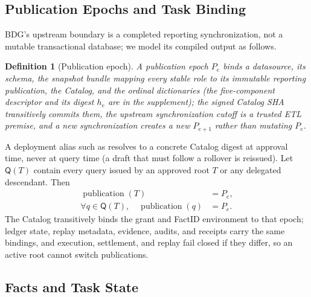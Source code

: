 \documentclass[10pt,journal,compsoc]{IEEEtran}
\newcommand{\code}[1]{\texttt{\detokenize{#1}}}
\newtheorem{definition}{Definition}
\begin{document}
\subsection{Publication Epochs and Task Binding}

BDG's upstream boundary is a completed reporting synchronization, not a
mutable transactional database; we model its compiled output as follows.

\begin{definition}[Publication epoch]
A publication epoch $P_e$ binds a datasource, its schema, the snapshot
bundle mapping every stable role to its immutable reporting publication,
the Catalog, and the ordinal dictionaries (the five-component descriptor
and its digest $h_e$ are in the supplement); the signed Catalog SHA
transitively commits them, the upstream synchronization cutoff is a
trusted ETL premise, and a new synchronization creates a new $P_{e+1}$
rather than mutating $P_e$.
\end{definition}

A deployment alias such as \code{latest publication} resolves to a concrete
Catalog digest at approval time, never at query time (a draft that must
follow a rollover is reissued). Let $\mathsf Q(T)$ contain every query issued by an approved root
$T$ or any delegated descendant. Then
\begin{equation}
 \begin{aligned}
 \operatorname{publication}(T)&=P_e,\\
 \forall q\in\mathsf Q(T),\quad \operatorname{publication}(q)&=P_e.
 \end{aligned}
 \label{eq:publication-binding}
\end{equation}
The Catalog transitively binds the grant and FactID environment to that
epoch; ledger state, replay metadata, evidence, audits, and receipts carry
the same bindings, and execution, settlement, and replay fail closed if
they differ, so an active root cannot switch publications.

\subsection{Facts and Task State}
\end{document}
